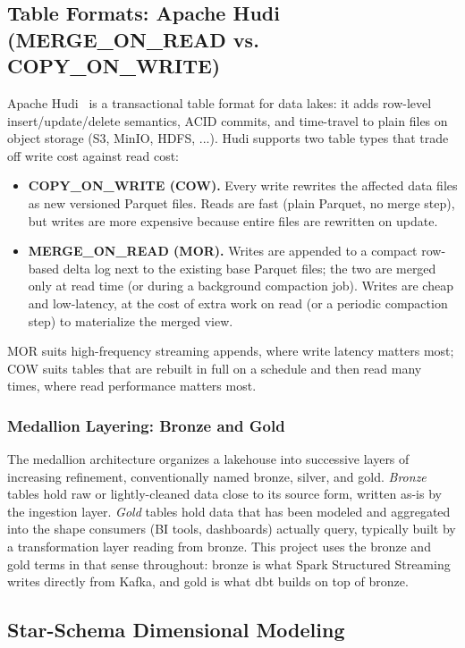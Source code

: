 \subsection{Table Formats: Apache Hudi (MERGE\_ON\_READ vs. COPY\_ON\_WRITE)}

Apache Hudi~\cite{hudi} is a transactional table format for data lakes: it adds row-level insert/update/delete semantics, ACID commits, and time-travel to plain files on object storage (S3, MinIO, HDFS, ...). Hudi supports two table types that trade off write cost against read cost:

\begin{itemize}
    \item \textbf{COPY\_ON\_WRITE (COW).} Every write rewrites the affected data files as new versioned Parquet files. Reads are fast (plain Parquet, no merge step), but writes are more expensive because entire files are rewritten on update.
    \item \textbf{MERGE\_ON\_READ (MOR).} Writes are appended to a compact row-based delta log next to the existing base Parquet files; the two are merged only at read time (or during a background compaction job). Writes are cheap and low-latency, at the cost of extra work on read (or a periodic compaction step) to materialize the merged view.
\end{itemize}

MOR suits high-frequency streaming appends, where write latency matters most; COW suits tables that are rebuilt in full on a schedule and then read many times, where read performance matters most.

\subsubsection{Medallion Layering: Bronze and Gold}

The medallion architecture organizes a lakehouse into successive layers of increasing refinement, conventionally named bronze, silver, and gold. \emph{Bronze} tables hold raw or lightly-cleaned data close to its source form, written as-is by the ingestion layer. \emph{Gold} tables hold data that has been modeled and aggregated into the shape consumers (BI tools, dashboards) actually query, typically built by a transformation layer reading from bronze. This project uses the bronze and gold terms in that sense throughout: bronze is what Spark Structured Streaming writes directly from Kafka, and gold is what dbt builds on top of bronze.

\subsection{Star-Schema Dimensional Modeling}

